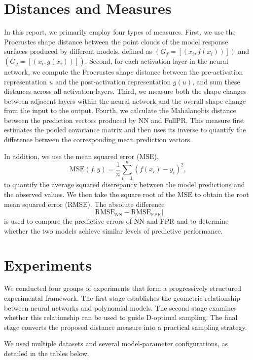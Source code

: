 \documentclass[]{interact}
\theoremstyle{plain}
\theoremstyle{definition}
\theoremstyle{remark}
\begin{document}
\section{Distances and Measures}

In this report, we primarily employ four types of measures. First, we use the Procrustes shape distance between the point clouds of the model response surfaces produced by different models, defined as $(G_f=[(x_i,f(x_i))])$ and $(G_g=[(x_i,g(x_i))])$. Second, for each activation layer in the neural network, we compute the Procrustes shape distance between the pre-activation representation $u$ and the post-activation representation $g(u)$, and sum these distances across all activation layers. Third, we measure both the shape changes between adjacent layers within the neural network and the overall shape change from the input to the output. Fourth, we calculate the Mahalanobis distance between the prediction vectors produced by NN and FullPR. This measure first estimates the pooled covariance matrix and then uses its inverse to quantify the difference between the corresponding mean prediction vectors.

In addition, we use the mean squared error (MSE),
$$\mathrm{MSE}(f,y)=\frac{1}{n}\sum_{i=1}^{n}\left(f(x_i)-y_i\right)^2,$$
to quantify the average squared discrepancy between the model predictions and the observed values. We then take the square root of the MSE to obtain the root mean squared error (RMSE). The absolute difference
$$\left|\mathrm{RMSE}_{\mathrm{NN}}-\mathrm{RMSE}_\mathrm{FPR}\right|$$
is used to compare the predictive errors of NN and FPR and to determine whether the two models achieve similar levels of predictive performance.


\section{Experiments}


We conducted four groups of experiments that form a progressively structured experimental framework. The first stage establishes the geometric relationship between neural networks and polynomial models. The second stage examines whether this relationship can be used to guide D-optimal sampling. The final stage converts the proposed distance measure into a practical sampling strategy.

We used multiple datasets and several model-parameter configurations, as detailed in the tables  below.
\end{document}
